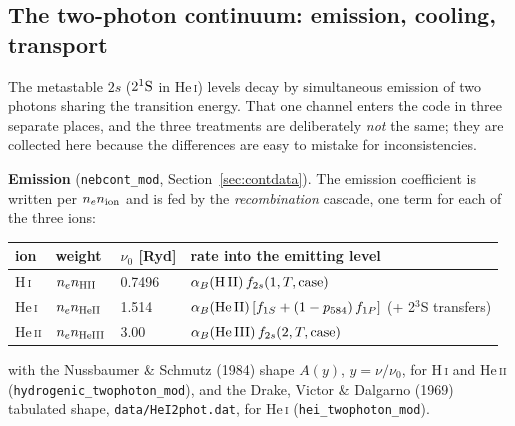 \documentclass[english,a4paper]{my_memo}
\newcommand{\code}[1]{\texttt{#1}}
\begin{document}
\subsection{The two-photon continuum: emission, cooling, transport}
\label{sec:twophoton}
The metastable $2s$ ($2^1{\rm S}$ in He\,\textsc{i}) levels decay by
simultaneous emission of two photons sharing the transition energy.  That
one channel enters the code in three separate places, and the three
treatments are deliberately \emph{not} the same; they are collected here
because the differences are easy to mistake for inconsistencies.

\textbf{Emission} (\code{nebcont\_mod}, Section~\ref{sec:contdata}).  The
emission coefficient is written per $n_e n_{\rm ion}$ and is fed by the
\emph{recombination} cascade, one term for each of the three ions:
\begin{center}
\begin{tabular}{llll}
\toprule
ion & weight & $\nu_0$ [Ryd] & rate into the emitting level \\
\midrule
H\,\textsc{i}   & $n_e n_{\rm HII}$   & 0.7496 &
  $\alpha_B({\rm H\,II})\,f_{2s}(1, T, {\rm case})$ \\
He\,\textsc{i}  & $n_e n_{\rm HeII}$  & 1.514  &
  $\alpha_B({\rm He\,II})\left[f_{1S} + (1-p_{584})\,f_{1P}\right]$
  (+ 2$^3$S transfers) \\
He\,\textsc{ii} & $n_e n_{\rm HeIII}$ & 3.00   &
  $\alpha_B({\rm He\,III})\,f_{2s}(2, T, {\rm case})$ \\
\bottomrule
\end{tabular}
\end{center}
with the Nussbaumer \& Schmutz (1984) shape $A(y)$, $y = \nu/\nu_0$, for
H\,\textsc{i} and He\,\textsc{ii} (\code{hydrogenic\_twophoton\_mod}), and the
Drake, Victor \& Dalgarno (1969) tabulated shape,
\code{data/HeI2phot.dat}, for He\,\textsc{i} (\code{hei\_twophoton\_mod}).
\end{document}
